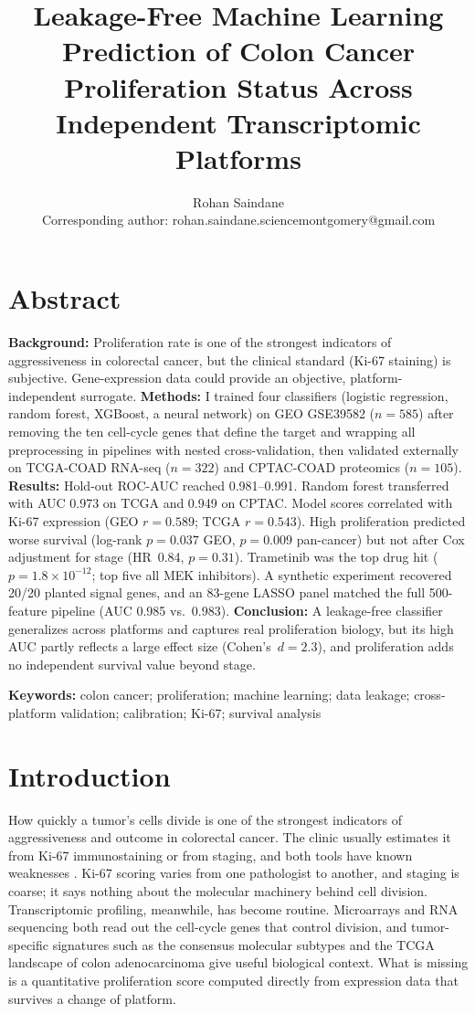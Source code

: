 \documentclass[11pt]{article}
\title{\textbf{Leakage-Free Machine Learning Prediction of Colon Cancer Proliferation Status Across Independent Transcriptomic Platforms}}
\author{Rohan Saindane\\Corresponding author: rohan.saindane.sciencemontgomery@gmail.com}
\date{}
\begin{document}
\maketitle

\section*{Abstract}
\textbf{Background:} Proliferation rate is one of the strongest indicators of aggressiveness in colorectal cancer, but the clinical standard (Ki-67 staining) is subjective. Gene-expression data could provide an objective, platform-independent surrogate. \textbf{Methods:} I trained four classifiers (logistic regression, random forest, XGBoost, a neural network) on GEO GSE39582 ($n=585$) after removing the ten cell-cycle genes that define the target and wrapping all preprocessing in pipelines with nested cross-validation, then validated externally on TCGA-COAD RNA-seq ($n=322$) and CPTAC-COAD proteomics ($n=105$). \textbf{Results:} Hold-out ROC-AUC reached 0.981--0.991. Random forest transferred with AUC 0.973 on TCGA and 0.949 on CPTAC. Model scores correlated with Ki-67 expression (GEO $r=0.589$; TCGA $r=0.543$). High proliferation predicted worse survival (log-rank $p=0.037$ GEO, $p=0.009$ pan-cancer) but not after Cox adjustment for stage (HR~0.84, $p=0.31$). Trametinib was the top drug hit ($p=1.8\times10^{-12}$; top five all MEK inhibitors). A synthetic experiment recovered 20/20 planted signal genes, and an 83-gene LASSO panel matched the full 500-feature pipeline (AUC 0.985 vs.\ 0.983). \textbf{Conclusion:} A leakage-free classifier generalizes across platforms and captures real proliferation biology, but its high AUC partly reflects a large effect size (Cohen's~$d=2.3$), and proliferation adds no independent survival value beyond stage.

\textbf{Keywords:} colon cancer; proliferation; machine learning; data leakage; cross-platform validation; calibration; Ki-67; survival analysis

\section{Introduction}

How quickly a tumor's cells divide is one of the strongest indicators of aggressiveness and outcome in colorectal cancer. The clinic usually estimates it from Ki-67 immunostaining or from staging, and both tools have known weaknesses \cite{zeng2025}. Ki-67 scoring varies from one pathologist to another, and staging is coarse; it says nothing about the molecular machinery behind cell division. Transcriptomic profiling, meanwhile, has become routine. Microarrays and RNA sequencing both read out the cell-cycle genes that control division, and tumor-specific signatures such as the consensus molecular subtypes \cite{guinney2015} and the TCGA landscape of colon adenocarcinoma \cite{tcga2012} give useful biological context. What is missing is a quantitative proliferation score computed directly from expression data that survives a change of platform.
\end{document}
